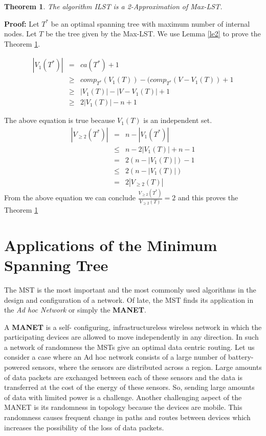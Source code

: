 \documentclass[12pt]{article}
\newtheorem{theorem}{Theorem}
\theoremstyle{plain}
\begin{document}
\begin{theorem}\label{thMax}
The algorithm ILST is a 2-Approximation of Max-LST.
\end{theorem}

\noindent
\textbf{Proof:}
Let $T^*$ be an optimal spanning tree with maximum number of internal nodes. Let $T$ be the tree given by the 
Max-LST. We use Lemma \ref{le2} to prove the Theorem \ref{thMax}.

\begin{eqnarray}
|V_1(T^*)|&=&ca(T^*)+1\nonumber\\
			&\geq & comp_{T^*}(V_1(T)) - (comp_{T^*}(V-V_1(T)) + 1\nonumber\\
			&\geq & |V_1(T)|-|V-V_1(T)|+1\nonumber\\
			&\geq & 2|V_1(T)|-n+1\nonumber
\end{eqnarray}
 
The above equation is true because $V_1(T)$ is an independent set.
\begin{eqnarray}
|V_{\geq 2}(T^*)|& = & n-|V_1(T^*)|\nonumber\\
					  &\leq & n-2|V_1(T)| +n-1\nonumber\\
					  &= & 2(n-|V_1(T)|)-1\nonumber\\
					  & \leq & 2(n-|V_1(T)|)\nonumber\\
					  &=&2|V_{\geq 2}(T)|\nonumber
\end{eqnarray}
From the above equation we can conclude $\frac{V_{\geq 2}(T^*)}{V_{\geq 2}(T)} =2$ and this proves the Theorem 
\ref{thMax}

  
\section*{Applications of the Minimum Spanning Tree }

The MST is the most important and the most commonly used algorithms in the design and configuration of a network. Of late, the MST finds its application in the \textit{ Ad hoc Network} or simply the \textbf{MANET}.

A \textbf{MANET} is a self- configuring, infrastructureless wireless network in which the participating devices are allowed to move independently in any direction. In such a network of randomness the MSTs give an optimal data centric routing. Let us consider a case where an Ad hoc network consists of a large number of battery-powered sensors, where the sensors are distributed across a region. Large amounts of data packets are exchanged between each of these sensors and the data is transferred at the cost of the energy of these sensors. So, sending large amounts of data with limited power is a challenge. Another challenging aspect of the MANET is its randomness in topology because the devices are mobile. This randomness causes frequent change in paths and routes between devices which increases the possibility of the loss of data packets.
\end{document}
